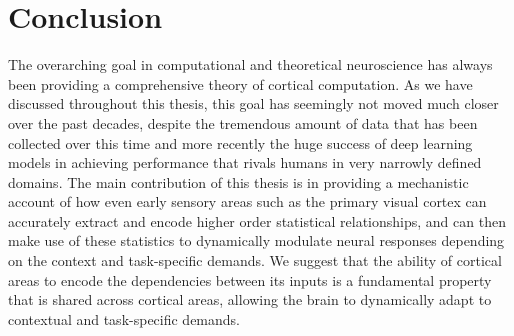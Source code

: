 \chapter{Conclusion}

The overarching goal in computational and theoretical neuroscience has
always been providing a comprehensive theory of cortical
computation. As we have discussed throughout this thesis, this goal has
seemingly not moved much closer over the past decades, despite the
tremendous amount of data that has been collected over this time and
more recently the huge success of deep learning models in achieving
performance that rivals humans in very narrowly defined domains. The
main contribution of this thesis is in providing a mechanistic account
of how even early sensory areas such as the primary visual cortex can
accurately extract and encode higher order statistical relationships,
and can then make use of these statistics to dynamically modulate neural
responses depending on the context and task-specific demands. We
suggest that the ability of cortical areas to encode the dependencies
between its inputs is a fundamental property that is shared across
cortical areas, allowing the brain to dynamically adapt to contextual
and task-specific demands.
